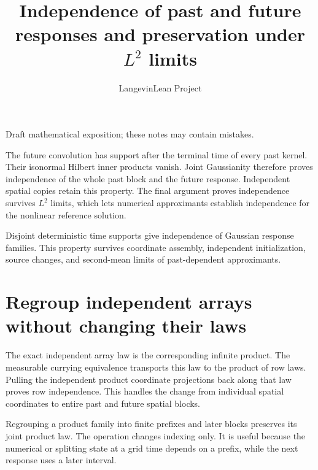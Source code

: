 \documentclass[11pt,a4paper]{article}
\title{\texorpdfstring{Independence of past and future responses and preservation under \(L^{2}\) limits}{Independence of past and future responses and preservation under L² limits}}
\author{LangevinLean Project}
\date{}
\begin{document}
\maketitle
Draft mathematical exposition; these notes may contain mistakes.


The future convolution has support after the terminal time of every past kernel. Their isonormal Hilbert inner products vanish. Joint Gaussianity therefore proves independence of the whole past block and the future response. Independent spatial copies retain this property. The final argument proves independence survives \(L^{2}\) limits, which lets numerical approximants establish independence for the nonlinear reference solution.



Disjoint deterministic time supports give independence of Gaussian response families. This property survives coordinate assembly, independent initialization, source changes, and second-mean limits of past-dependent approximants.


\section{\texorpdfstring{Regroup independent arrays without changing their laws}{Regroup independent arrays without changing their laws}}


The exact independent array law is the corresponding infinite product. The measurable currying equivalence transports this law to the product of row laws. Pulling the independent product coordinate projections back along that law proves row independence. This handles the change from individual spatial coordinates to entire past and future spatial blocks.



Regrouping a product family into finite prefixes and later blocks preserves its joint product law. The operation changes indexing only. It is useful because the numerical or splitting state at a grid time depends on a prefix, while the next response uses a later interval.
\end{document}

